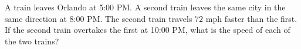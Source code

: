 A train leaves Orlando at 5:00 PM. A second train leaves the same city in the same direction at 8:00 PM. The second train travels $72$ mph faster than the first. If the second train overtakes the first at 10:00 PM, what is the speed of each of the two trains?

